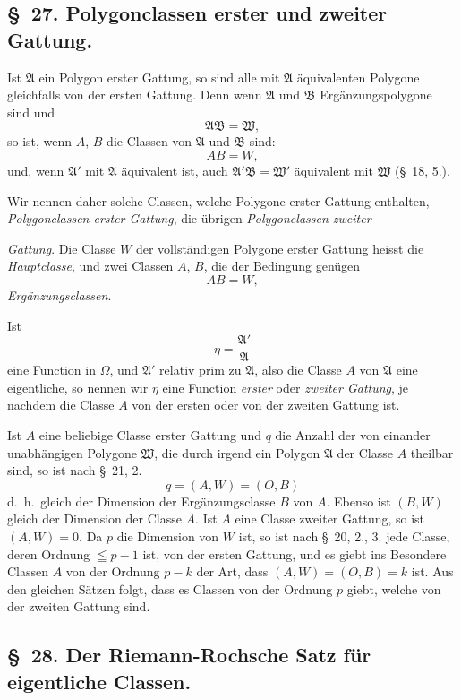 \documentclass{article}
\begin{document}
\subsection*{§~27. Polygonclassen erster und zweiter Gattung.}

Ist $\mathfrak{A}$ ein Polygon erster Gattung, so sind alle mit $\mathfrak{A}$ äquivalenten Polygone gleichfalls von der ersten Gattung. Denn wenn $\mathfrak{A}$ und $\mathfrak{B}$ Ergänzungspolygone sind und
\[ \mathfrak{A}\mathfrak{B} = \mathfrak{W}, \]
so ist, wenn $A$, $B$ die Classen von $\mathfrak{A}$ und $\mathfrak{B}$ sind:
\[ AB = W, \]
und, wenn $\mathfrak{A}'$ mit $\mathfrak{A}$ äquivalent ist, auch $\mathfrak{A}'\mathfrak{B} = \mathfrak{W}'$ äquivalent mit $\mathfrak{W}$ (§~18, 5.).

Wir nennen daher solche Classen, welche Polygone erster Gattung enthalten, \emph{Polygonclassen erster Gattung}, die übrigen \emph{Polygonclassen zweiter}

\emph{Gattung}. Die Classe $W$ der vollständigen Polygone erster Gattung heisst die \emph{Hauptclasse}, und zwei Classen $A$, $B$, die der Bedingung genügen
\[ AB = W, \]
\emph{Ergänzungsclassen}.

Ist
\[ \eta = \frac{\mathfrak{A}'}{\mathfrak{A}} \]
eine Function in $\Omega$, und $\mathfrak{A}'$ relativ prim zu $\mathfrak{A}$, also die Classe $A$ von $\mathfrak{A}$ eine eigentliche, so nennen wir $\eta$ eine Function \emph{erster} oder \emph{zweiter Gattung}, je nachdem die Classe $A$ von der ersten oder von der zweiten Gattung ist.

Ist $A$ eine beliebige Classe erster Gattung und $q$ die Anzahl der von einander unabhängigen Polygone $\mathfrak{W}$, die durch irgend ein Polygon $\mathfrak{A}$ der Classe $A$ theilbar sind, so ist nach §~21, 2.
\[ q = (A, W) = (O, B) \]
d.\ h.\ gleich der Dimension der Ergänzungsclasse $B$ von $A$. Ebenso ist $(B, W)$ gleich der Dimension der Classe $A$. Ist $A$ eine Classe zweiter Gattung, so ist $(A, W) = 0$. Da $p$ die Dimension von $W$ ist, so ist nach §~20, 2., 3. jede Classe, deren Ordnung $\leqq p-1$ ist, von der ersten Gattung, und es giebt ins Besondere Classen $A$ von der Ordnung $p-k$ der Art, dass $(A, W) = (O, B) = k$ ist. Aus den gleichen Sätzen folgt, dass es Classen von der Ordnung $p$ giebt, welche von der zweiten Gattung sind.

\subsection*{§~28. Der Riemann-Rochsche Satz für eigentliche Classen.}
\end{document}
